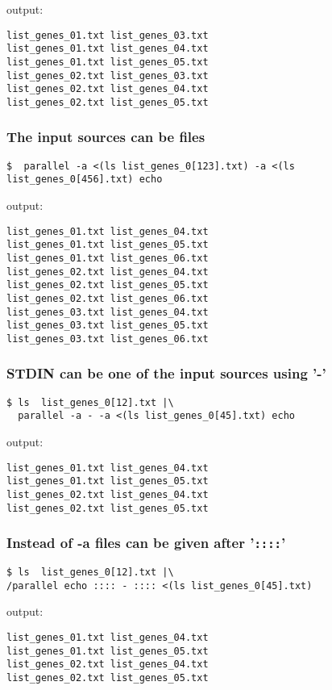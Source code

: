 \documentclass{article}
\begin{document}
output:
\begin{lstlisting}
list_genes_01.txt list_genes_03.txt
list_genes_01.txt list_genes_04.txt
list_genes_01.txt list_genes_05.txt
list_genes_02.txt list_genes_03.txt
list_genes_02.txt list_genes_04.txt
list_genes_02.txt list_genes_05.txt
\end{lstlisting}

\subsubsection{The input sources can be files}
\begin{lstlisting}
$  parallel -a <(ls list_genes_0[123].txt) -a <(ls list_genes_0[456].txt) echo
\end{lstlisting}
output:
\begin{lstlisting}
list_genes_01.txt list_genes_04.txt
list_genes_01.txt list_genes_05.txt
list_genes_01.txt list_genes_06.txt
list_genes_02.txt list_genes_04.txt
list_genes_02.txt list_genes_05.txt
list_genes_02.txt list_genes_06.txt
list_genes_03.txt list_genes_04.txt
list_genes_03.txt list_genes_05.txt
list_genes_03.txt list_genes_06.txt
\end{lstlisting}


\subsubsection{STDIN can be one of the input sources using '-'}
\begin{lstlisting}
$ ls  list_genes_0[12].txt |\
  parallel -a - -a <(ls list_genes_0[45].txt) echo
\end{lstlisting}
output:
\begin{lstlisting}
list_genes_01.txt list_genes_04.txt
list_genes_01.txt list_genes_05.txt
list_genes_02.txt list_genes_04.txt
list_genes_02.txt list_genes_05.txt
\end{lstlisting}

\subsubsection{Instead of -a files can be given after '\texttt{::::}'}
\begin{lstlisting}
$ ls  list_genes_0[12].txt |\
/parallel echo :::: - :::: <(ls list_genes_0[45].txt)
\end{lstlisting}
output:
\begin{lstlisting}
list_genes_01.txt list_genes_04.txt
list_genes_01.txt list_genes_05.txt
list_genes_02.txt list_genes_04.txt
list_genes_02.txt list_genes_05.txt
\end{lstlisting}
\end{document}
